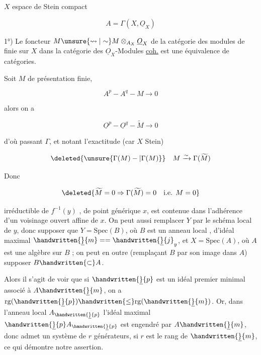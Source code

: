 $X$ espace de Stein compact

\[
 A=\Gamma(X,\underline O_X)
\]


1°) Le foncteur $M\unsure{\leadsto|\sim} M\otimes_{A_X}\underline O_X$ de la catégorie des modules de   finie sur $X$ dans la catégorie des $\underline O_X$-Modules \uline{coh.} est une équivalence de catégories.


Soit $M$ de présentation finie,

\[
 A^p - A^q - M \to 0
\]

alors on a

\[
 \underline O^p - \underline O^q - \widetilde M \to 0
\]

d'où passant  $\Gamma$, et notant l'exactitude (car $X$ Stein)

\[
 \deleted{\unsure{\Gamma(M)-|\Gamma(M)}} \quad M\xrightarrow{\sim}\Gamma(\widetilde M)
\]

Donc  

\[
 \deleted{\widetilde M=0\Rightarrow\Gamma(\widetilde M)=0\quad\text{i.e. }M=0}
\]

irréductible de $f^{-1}(y)$ , de point générique $x$, est contenue dans l'adhérence d'un voisinage ouvert affine de $x$. On peut aussi remplacer $Y$ par le schéma local de $y$, donc supposer que  $Y=\mathrm{Spec}(B)$, où $B$ est un anneau local , d'idéal maximal $\handwritten{\underline}{m}==\handwritten{\underline}{j}_y$, et $X=\mathrm{Spec}(A)$, où $A$ est une algèbre   sur $B$ ; on peut en outre (remplaçant $B$ par son image dans $A$) supposer $B\handwritten{\subset} A$.

Alors il s'agit de voir que si $\handwritten{\underline}{p}$ est  un idéal premier minimal associé à $A\handwritten{\underline}{m}$, on a $\mathrm{rg}(\handwritten{\underline}{p})\handwritten{\leq}\mathrm{rg}(\handwritten{\underline}{m})$. Or, dans l'anneau local  $A_{\handwritten{\underline}{p}}$ l'idéal maximal $\handwritten{\underline}{p}A_{\handwritten{\underline}{p}}$ est engendré par $A\handwritten{\underline}{m}$, donc admet un système de $r$ générateurs, si $r$ est le rang de $\handwritten{\underline}{m}$, ce qui démontre notre assertion.


